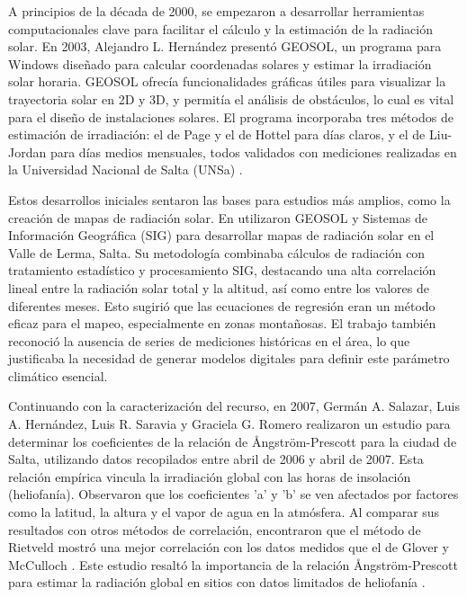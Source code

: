 \documentclass[letterpaper,12pt, twoside]{report}
\providecommand{\DIFdeltex}[1]{{\protect\color{red} \scriptsize #1}} %
\providecommand{\DIFdel}[1]{\texorpdfstring{\DIFdeltex{#1}}{}} %
\begin{document}
\DIFdel{A principios de la década de 2000, se empezaron a desarrollar herramientas computacionales clave para facilitar el cálculo y la estimación de la radiación solar. En 2003, Alejandro L. Hernández presentó GEOSOL, un programa para Windows diseñado para calcular coordenadas solares y estimar la irradiación solar horaria. GEOSOL ofrecía funcionalidades gráficas útiles para visualizar la trayectoria solar en 2D y 3D, y permitía el análisis de obstáculos, lo cual es vital para el diseño de instalaciones solares. El programa incorporaba tres métodos de estimación de irradiación: el de Page y el de Hottel \citep{Hottel1976} para días claros, y el de Liu-Jordan \citep{Liu1960}  para días medios mensuales, todos validados con mediciones realizadas en la Universidad Nacional de Salta (UNSa) \citep{Hernandez2003}.}%

\DIFdel{Estos desarrollos iniciales sentaron las bases para estudios más amplios, como la creación de mapas de radiación solar. En \citep{Belmonte2006} utilizaron GEOSOL y Sistemas de Información Geográfica (SIG) para desarrollar mapas de radiación solar en el Valle de Lerma, Salta. Su metodología combinaba cálculos de radiación con tratamiento estadístico y procesamiento SIG, destacando una alta correlación lineal entre la radiación solar total y la altitud, así como entre los valores de diferentes meses. Esto sugirió que las ecuaciones de regresión eran un método eficaz para el mapeo, especialmente en zonas montañosas. El trabajo también reconoció la ausencia de series de mediciones históricas en el área, lo que justificaba la necesidad de generar modelos digitales para definir este parámetro climático esencial.}%

\DIFdel{Continuando con la caracterización del recurso, en 2007, Germán A. Salazar, Luis A. Hernández, Luis R. Saravia y Graciela G. Romero realizaron un estudio para determinar los coeficientes de la relación de Ångström-Prescott \citep{angstrom1924,prescott1940} para la ciudad de Salta, utilizando datos recopilados entre abril de 2006 y abril de 2007. Esta relación empírica vincula la irradiación global con las horas de insolación (heliofanía). Observaron que los coeficientes 'a' y 'b' se ven afectados por factores como la latitud, la altura y el vapor de agua en la atmósfera. Al comparar sus resultados con otros métodos de correlación, encontraron que el método de Rietveld \citep{Rietveld1978} mostró una mejor correlación con los datos medidos que el de Glover y McCulloch \citep{Glover1958}. Este estudio resaltó la importancia de la relación Ångström-Prescott para estimar la radiación global en sitios con datos limitados de heliofanía \citep{Salazar2007}.}%
\end{document}
